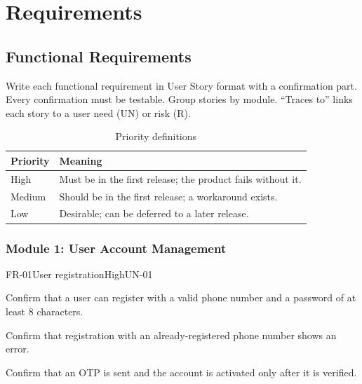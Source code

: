 \chapter{Requirements}\label{ch:req}

\section{Functional Requirements}\label{sec:fr}
\begin{guidance}
Write each functional requirement in User Story format with a confirmation part. Every confirmation must be testable. Group stories by module. ``Traces to'' links each story to a user need (UN) or risk (R).
\end{guidance}

\begin{table}[H]
\centering
\caption{Priority definitions}\label{tab:priority}
\begin{tabularx}{\textwidth}{|L{2.2cm}|X|}
\hline
{}\sffamily\bfseries Priority & \sffamily\bfseries Meaning \\ \hline
High   & Must be in the first release; the product fails without it. \\ \hline
Medium & Should be in the first release; a workaround exists. \\ \hline
Low    & Desirable; can be deferred to a later release. \\ \hline
\end{tabularx}
\end{table}

\subsection{Module 1: User Account Management}

\begin{userstory}{FR-01}{User registration}{High}{UN-01}
  \begin{confirmation}
    \item Confirm that a user can register with a valid phone number and a password of at least 8 characters.
    \item Confirm that registration with an already-registered phone number shows an error.
    \item Confirm that an OTP is sent and the account is activated only after it is verified.
  \end{confirmation}
\end{userstory}

